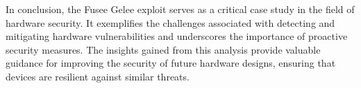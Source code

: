 In conclusion, the Fusee Gelee exploit serves as a critical case study in the field of hardware security. It exemplifies the challenges associated with detecting and mitigating hardware vulnerabilities and underscores the importance of proactive security measures. The insights gained from this analysis provide valuable guidance for improving the security of future hardware designs, ensuring that devices are resilient against similar threats.